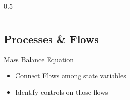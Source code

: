 \documentclass[final,xcolor=dvipsnames]{beamer}
\begin{document}
\begin{frame}
\begin{exampleblock}{}
\begin{columns}
\begin{column}{0.5\framewidth}
{\begin{figure}
		\end{figure} 
	      } 
	    \end{column}
	  \end{columns}
	\end{exampleblock} 
      \end{frame}
      
      \subsection{Processes \& Flows}
      \begin{frame}
	\begin{block}{Mass Balance Equation}
	  \begin{itemize}
	    \item Connect Flows among state variables
	    \item Identify controls on those flows
	  \end{itemize} 
	\end{block}
      \end{frame}
      
\end{document}
